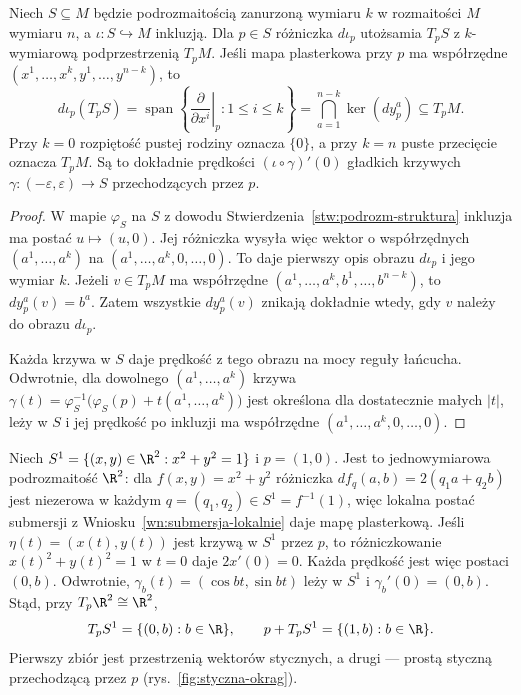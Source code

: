 \begin{stwierdzenie}
\label{stw:styczna-podrozmaitosci}
Niech $S\subseteq M$ będzie podrozmaitością zanurzoną wymiaru $k$
w rozmaitości $M$ wymiaru $n$, a $\iota\colon S\hookrightarrow M$
inkluzją. Dla $p\in S$ różniczka $d\iota_p$ utożsamia $T_pS$
z $k$-wymiarową podprzestrzenią $T_pM$. Jeśli mapa plasterkowa
przy $p$ ma współrzędne $(x^1,\ldots,x^k,y^1,\ldots,y^{n-k})$, to
\[
d\iota_p(T_pS)
=\operatorname{span}\left\{\left.\frac{\partial}{\partial x^i}\right|_p:
1\leq i\leq k\right\}
=\bigcap_{a=1}^{n-k}\ker(dy^a_p)\subseteq T_pM.
\]
Przy $k=0$ rozpiętość pustej rodziny oznacza $\{0\}$, a przy $k=n$
puste przecięcie oznacza $T_pM$.
Są to dokładnie prędkości $(\iota\circ\gamma)'(0)$ gładkich krzywych
$\gamma\colon(-\varepsilon,\varepsilon)\to S$ przechodzących przez $p$.
\end{stwierdzenie}
\begin{proof}
W mapie $\varphi_S$ na $S$ z dowodu
Stwierdzenia~\ref{stw:podrozm-struktura} inkluzja ma postać
$u\mapsto(u,0)$. Jej różniczka wysyła więc wektor o współrzędnych
$(a^1,\ldots,a^k)$ na $(a^1,\ldots,a^k,0,\ldots,0)$.
To daje pierwszy opis obrazu $d\iota_p$ i jego wymiar $k$.
Jeżeli $v\in T_pM$ ma współrzędne $(a^1,\ldots,a^k,b^1,\ldots,b^{n-k})$,
to $dy^a_p(v)=b^a$. Zatem wszystkie $dy^a_p(v)$ znikają dokładnie
wtedy, gdy $v$ należy do obrazu $d\iota_p$.

Każda krzywa w $S$ daje prędkość z tego obrazu na mocy reguły łańcucha.
Odwrotnie, dla dowolnego $(a^1,\ldots,a^k)$ krzywa
$\gamma(t)=\varphi_S^{-1}\bigl(\varphi_S(p)+t(a^1,\ldots,a^k)\bigr)$
jest określona dla dostatecznie małych $|t|$, leży w $S$ i jej prędkość
po inkluzji ma współrzędne $(a^1,\ldots,a^k,0,\ldots,0)$.
\end{proof}

\begin{przyklad}
Niech $S^1=\{(x,y)\in\R^2:x^2+y^2=1\}$ i $p=(1,0)$.
Jest to jednowymiarowa podrozmaitość $\R^2$: dla
$f(x,y)=x^2+y^2$ różniczka $df_q(a,b)=2(q_1a+q_2b)$ jest niezerowa
w każdym $q=(q_1,q_2)\in S^1=f^{-1}(1)$, więc lokalna postać
submersji z Wniosku~\ref{wn:submersja-lokalnie} daje mapę plasterkową.
Jeśli $\eta(t)=(x(t),y(t))$ jest krzywą w $S^1$ przez $p$, to
różniczkowanie $x(t)^2+y(t)^2=1$ w $t=0$ daje $2x'(0)=0$.
Każda prędkość jest więc postaci $(0,b)$. Odwrotnie,
$\gamma_b(t)=(\cos bt,\sin bt)$ leży w $S^1$ i
$\gamma_b'(0)=(0,b)$. Stąd, przy $T_p\R^2\cong\R^2$,
\[
T_pS^1=\{(0,b):b\in\R\},\qquad
p+T_pS^1=\{(1,b):b\in\R\}.
\]
Pierwszy zbiór jest przestrzenią wektorów stycznych, a drugi ---
prostą styczną przechodzącą przez $p$ (rys.~\ref{fig:styczna-okrag}).
\end{przyklad}

